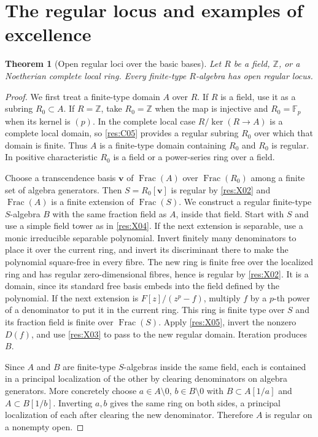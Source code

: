 \documentclass[11pt,oneside,openany]{book}
\newtheorem{theorem}{Theorem}[chapter]
\theoremstyle{definition}
\theoremstyle{remark}
\begin{document}
\section[The regular locus]{The regular locus and examples of excellence}

\begin{theorem}[Open regular loci over the basic bases]\label{res:X08}
Let \(R\) be a field, \(\mathbb Z\), or a Noetherian complete local ring. Every finite-type \(R\)-algebra has open regular locus.
\end{theorem}
\begin{proof}
We first treat a finite-type domain \(A\) over \(R\). If \(R\) is a field, use it as a subring \(R_0\subset A\). If \(R=\mathbb Z\), take \(R_0=\mathbb Z\) when the map is injective and \(R_0=\mathbb F_p\) when its kernel is \((p)\). In the complete local case \(R/\ker(R\to A)\) is a complete local domain, so \ref{res:C05} provides a regular subring \(R_0\) over which that domain is finite. Thus \(A\) is a finite-type domain containing \(R_0\) and \(R_0\) is regular. In positive characteristic \(R_0\) is a field or a power-series ring over a field.

Choose a transcendence basis \(\mathbf v\) of \(\operatorname{Frac}(A)\) over \(\operatorname{Frac}(R_0)\) among a finite set of algebra generators. Then \(S=R_0[\mathbf v]\) is regular by \ref{res:X02} and \(\operatorname{Frac}(A)\) is a finite extension of \(\operatorname{Frac}(S)\). We construct a regular finite-type \(S\)-algebra \(B\) with the same fraction field as \(A\), inside that field. Start with \(S\) and use a simple field tower as in \ref{res:X04}. If the next extension is separable, use a monic irreducible separable polynomial. Invert finitely many denominators to place it over the current ring, and invert its discriminant there to make the polynomial square-free in every fibre. The new ring is finite free over the localized ring and has regular zero-dimensional fibres, hence is regular by \ref{res:X02}. It is a domain, since its standard free basis embeds into the field defined by the polynomial. If the next extension is \(F[z]/(z^p-f)\), multiply \(f\) by a \(p\)-th power of a denominator to put it in the current ring. This ring is finite type over \(S\) and its fraction field is finite over \(\operatorname{Frac}(S)\). Apply \ref{res:X05}, invert the nonzero \(D(f)\), and use \ref{res:X03} to pass to the new regular domain. Iteration produces \(B\).

Since \(A\) and \(B\) are finite-type \(S\)-algebras inside the same field, each is contained in a principal localization of the other by clearing denominators on algebra generators. More concretely choose \(a\in A\setminus0\), \(b\in B\setminus0\) with \(B\subset A[1/a]\) and \(A\subset B[1/b]\). Inverting \(a,b\) gives the same ring on both sides, a principal localization of each after clearing the new denominator. Therefore \(A\) is regular on a nonempty open.


\end{proof}
\end{document}
